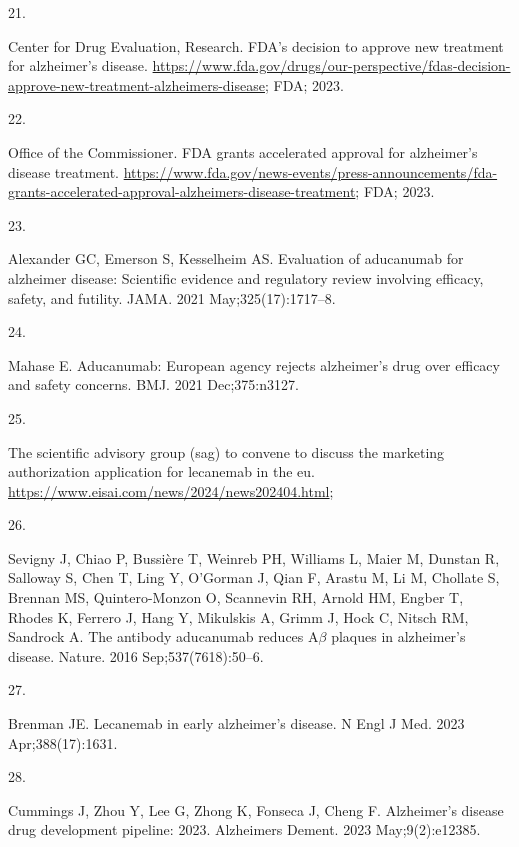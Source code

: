 \documentclass[
  a4paper,
]{article}
\newlength{\cslhangindent}
\newlength{\csllabelwidth}
\newlength{\cslentryspacingunit} %
\newenvironment{CSLReferences}[2] %
 {%
  \setlength{\parindent}{0pt}
  \ifodd #1
  \let\oldpar\par
  \def\par{\hangindent=\cslhangindent\oldpar}
  \fi
  \setlength{\parskip}{#2\cslentryspacingunit}
 }%
 {}
\newcommand{\CSLLeftMargin}[1]{\parbox[t]{\csllabelwidth}{#1}}
\newcommand{\CSLRightInline}[1]{\parbox[t]{\linewidth - \csllabelwidth}{#1}\break}
\begin{document}
\begin{CSLReferences}{0}{0}
\leavevmode{}%
\CSLLeftMargin{21. }%
\CSLRightInline{Center for Drug Evaluation, Research. {FDA's} decision
to approve new treatment for alzheimer's disease.
\url{https://www.fda.gov/drugs/our-perspective/fdas-decision-approve-new-treatment-alzheimers-disease};
FDA; 2023. }

\leavevmode{}%
\CSLLeftMargin{22. }%
\CSLRightInline{Office of the Commissioner. {FDA} grants accelerated
approval for alzheimer's disease treatment.
\url{https://www.fda.gov/news-events/press-announcements/fda-grants-accelerated-approval-alzheimers-disease-treatment};
FDA; 2023. }

\leavevmode{}%
\CSLLeftMargin{23. }%
\CSLRightInline{Alexander GC, Emerson S, Kesselheim AS. Evaluation of
aducanumab for alzheimer disease: Scientific evidence and regulatory
review involving efficacy, safety, and futility. JAMA. 2021
May;325(17):1717--8. }

\leavevmode{}%
\CSLLeftMargin{24. }%
\CSLRightInline{Mahase E. Aducanumab: European agency rejects
alzheimer's drug over efficacy and safety concerns. BMJ. 2021
Dec;375:n3127. }

\leavevmode{}%
\CSLLeftMargin{25. }%
\CSLRightInline{The scientific advisory group (sag) to convene to
discuss the marketing authorization application for lecanemab in the eu.
\url{https://www.eisai.com/news/2024/news202404.html}; }

\leavevmode{}%
\CSLLeftMargin{26. }%
\CSLRightInline{Sevigny J, Chiao P, Bussière T, Weinreb PH, Williams L,
Maier M, Dunstan R, Salloway S, Chen T, Ling Y, O'Gorman J, Qian F,
Arastu M, Li M, Chollate S, Brennan MS, Quintero-Monzon O, Scannevin RH,
Arnold HM, Engber T, Rhodes K, Ferrero J, Hang Y, Mikulskis A, Grimm J,
Hock C, Nitsch RM, Sandrock A. The antibody aducanumab reduces
{A\(\beta\)} plaques in alzheimer's disease. Nature. 2016
Sep;537(7618):50--6. }

\leavevmode{}%
\CSLLeftMargin{27. }%
\CSLRightInline{Brenman JE. Lecanemab in early alzheimer's disease. N
Engl J Med. 2023 Apr;388(17):1631. }

\leavevmode{}%
\CSLLeftMargin{28. }%
\CSLRightInline{Cummings J, Zhou Y, Lee G, Zhong K, Fonseca J, Cheng F.
Alzheimer's disease drug development pipeline: 2023. Alzheimers Dement.
2023 May;9(2):e12385. }


\end{CSLReferences}
\end{document}
